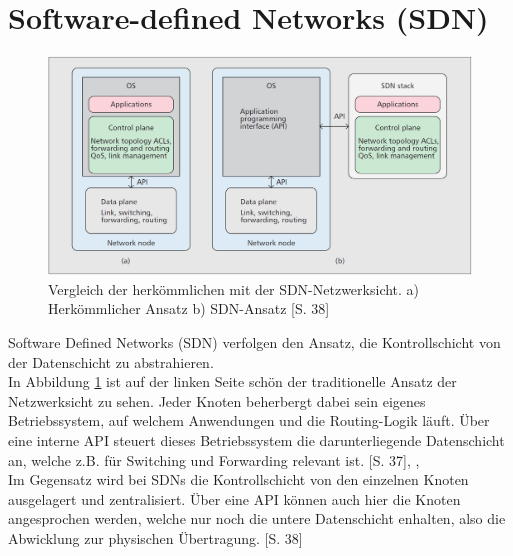 \documentclass[10pt,conference]{IEEEtran}
\begin{document}
\section{Software-defined Networks (SDN)}
\begin{figure}[h]
	\centering
	\includegraphics[width=\columnwidth]{images/VergleichHerkoemmlichSDN.PNG}
	\caption{Vergleich der herkömmlichen mit der SDN-Netzwerksicht. a) Herkömmlicher Ansatz b) SDN-Ansatz \cite{1}[S. 38]}
	\label{fig:VergleichHerkoemmlichSDN}
\end{figure}
Software Defined Networks (SDN) verfolgen den Ansatz, die Kontrollschicht von der Datenschicht zu abstrahieren.\\
In Abbildung \ref{fig:VergleichHerkoemmlichSDN} ist auf der linken Seite schön der traditionelle Ansatz der Netzwerksicht zu sehen. Jeder Knoten beherbergt dabei sein eigenes Betriebssystem, auf welchem Anwendungen und die Routing-Logik läuft. Über eine interne API steuert dieses Betriebssystem die darunterliegende Datenschicht an, welche z.B. für Switching und Forwarding relevant ist. \cite{1}[S. 37], \cite{5}, \cite{11} \\
\newline
Im Gegensatz wird bei SDNs die Kontrollschicht von den einzelnen Knoten ausgelagert und zentralisiert. Über eine API können auch hier die Knoten angesprochen werden, welche nur noch die untere Datenschicht enhalten, also die Abwicklung zur physischen Übertragung. \cite{1}[S. 38] 
\end{document}
